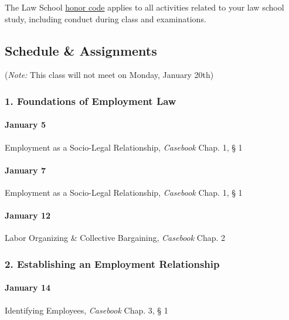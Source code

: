 \documentclass[11pt,letterpaper,twoside]{article}
\begin{document}
The Law School
\href{https://www.elon.edu/u/law/students/honor-code/}{honor code}
applies to all activities related to your law school study, including
conduct during class and examinations.

\subsection*{Schedule \& Assignments}\label{schedule-assignments}

(\emph{Note:} This class will not meet on Monday, January 20th)

\subsubsection{1. Foundations of Employment
Law}\label{foundations-of-employment-law}

\paragraph{January 5}\label{january-5}

Employment as a Socio-Legal Relationship, \emph{Casebook} Chap. 1, § 1

\paragraph{January 7}\label{january-7}

Employment as a Socio-Legal Relationship, \emph{Casebook} Chap. 1, § 1

\paragraph{January 12}\label{january-12}

Labor Organizing \& Collective Bargaining, \emph{Casebook} Chap. 2

\subsubsection{2. Establishing an Employment
Relationship}\label{establishing-an-employment-relationship}

\paragraph{January 14}\label{january-14}

Identifying Employees, \emph{Casebook} Chap. 3, § 1
\end{document}
